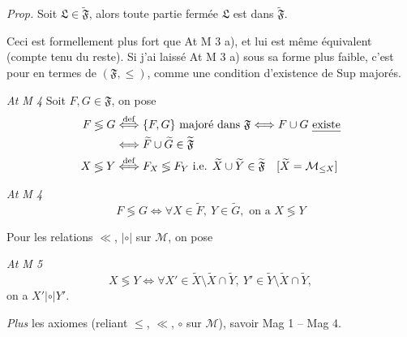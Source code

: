 \documentclass[11pt,a4paper]{article}
\begin{document}
 

\emph{Prop.} Soit $\mathfrak{L} \in \widetilde{\mathfrak{F}}$, alors toute
partie fermée   $\mathfrak{L}$ est dans
$\widetilde{\mathfrak{F}}$.

Ceci \struck{\ill{}}  est formellement plus fort que At M 3 a), et
lui est même équivalent (compte tenu du reste). Si j'ai laissé At M 3 a) sous
sa forme  plus faible, c'est pour 
\ill{} en termes de $(\mathfrak{F}, \leq)$, comme une condition d'existence de
Sup majorés.

\emph{At M 4} 
Soit $F, G \in \mathfrak{F}$, on pose
\begin{align*}
  F \lessgtr G &\overset{\mathrm{def}}{\Longleftrightarrow}
    \{F, G\} \text{ majoré dans } \mathfrak{F} \Longleftrightarrow
    F \cup G \text{ \uncertain{existe}} \\
  &\Longleftrightarrow \widetilde{F} \cup \widetilde{G} \in \widetilde{\mathfrak{F}} \\
  X \lessgtr Y &\overset{\mathrm{def}}{\Longleftrightarrow} F_{X} \lessgtr F_{Y}
    \text{ i.e. } \widetilde{X} \cup \widetilde{Y} \in \widetilde{\mathfrak{F}}
    \quad [\widetilde{X} = \mathcal{M}_{\leq X}]
\end{align*}

\emph{At M 4}
\[
  F \lessgtr G \Longleftrightarrow \forall X \in \widetilde{F},\
  Y \in \widetilde{G}, \text{ on a } X \lessgtr Y
\]

\struck{\ill{}} Pour les relations \ill{} $\ll$, $|\circ|$ sur $\mathcal{M}$,
on pose

\emph{At M 5}
\[
  X \lessgtr Y \Longleftrightarrow \forall X' \in \widetilde{X} \setminus
  \widetilde{X} \cap \widetilde{Y},\
  Y' \in \widetilde{Y} \setminus \widetilde{X} \cap \widetilde{Y},
\]
on a $X' \mathrel{|\circ|} Y'$.

\page{23}
\emph{Plus} les axiomes  (reliant $\leq$, $\ll$, $\circ$ sur
$\mathcal{M}$), savoir Mag 1 -- Mag 4.
\end{document}

